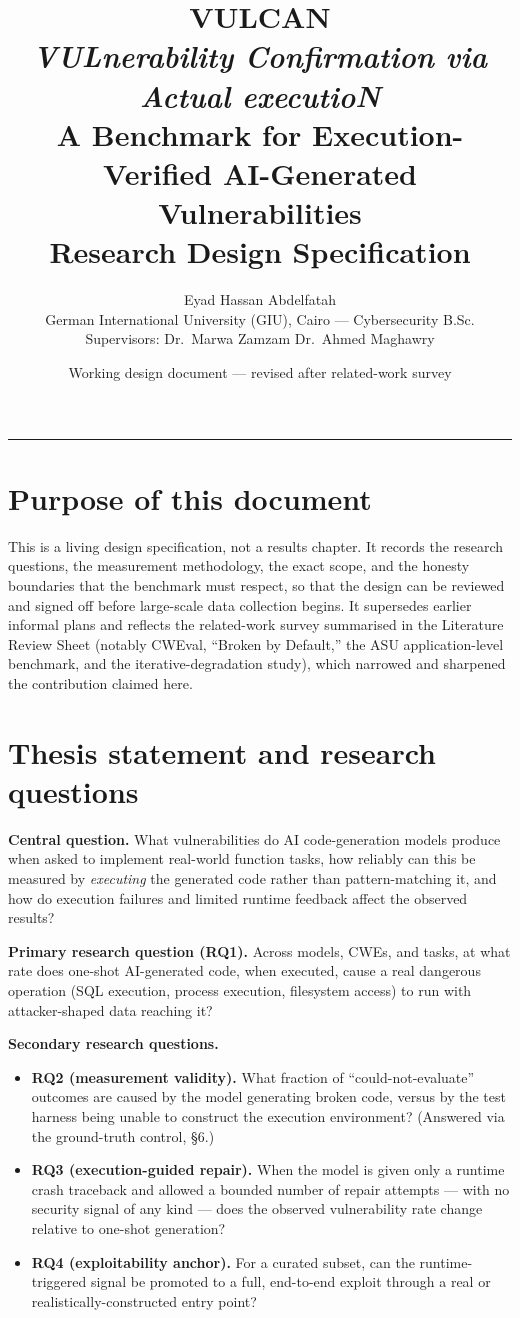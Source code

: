 \documentclass[11pt]{article}
\title{\vspace{-1.2cm}\textbf{\Huge VULCAN}\\[3pt]
\normalsize\textit{VULnerability Confirmation via Actual executioN}\\[8pt]
\large A Benchmark for Execution-Verified AI-Generated Vulnerabilities\\[3pt]
\normalsize Research Design Specification}
\author{Eyad Hassan Abdelfatah \\
\small German International University (GIU), Cairo --- Cybersecurity B.Sc. \\
\small Supervisors: Dr.\ Marwa Zamzam \textbar{} Dr.\ Ahmed Maghawry}
\date{\small Working design document --- revised after related-work survey}
\begin{document}
\maketitle
\vspace{-0.6cm}

\hrule
\vspace{8pt}

\section{Purpose of this document}

This is a living design specification, not a results chapter. It records
the research questions, the measurement methodology, the exact scope, and
the honesty boundaries that the benchmark must respect, so that the design
can be reviewed and signed off before large-scale data collection begins.
It supersedes earlier informal plans and reflects the related-work survey
summarised in the Literature Review Sheet (notably CWEval, ``Broken by
Default,'' the ASU application-level benchmark, and the iterative-degradation
study), which narrowed and sharpened the contribution claimed here.

\section{Thesis statement and research questions}

\textbf{Central question.} What vulnerabilities do AI code-generation models
produce when asked to implement real-world function tasks, how reliably can
this be measured by \emph{executing} the generated code rather than
pattern-matching it, and how do execution failures and limited runtime
feedback affect the observed results?

\textbf{Primary research question (RQ1).} Across models, CWEs, and tasks,
at what rate does one-shot AI-generated code, when executed, cause a real
dangerous operation (SQL execution, process execution, filesystem access)
to run with attacker-shaped data reaching it?

\textbf{Secondary research questions.}
\begin{itemize}[leftmargin=1.4em,itemsep=1pt,topsep=2pt]
  \item \textbf{RQ2 (measurement validity).} What fraction of
  ``could-not-evaluate'' outcomes are caused by the model generating
  broken code, versus by the test harness being unable to construct the
  execution environment? (Answered via the ground-truth control, \S6.)
  \item \textbf{RQ3 (execution-guided repair).} When the model is given
  only a runtime crash traceback and allowed a bounded number of repair
  attempts --- with no security signal of any kind --- does the observed
  vulnerability rate change relative to one-shot generation?
  \item \textbf{RQ4 (exploitability anchor).} For a curated subset, can the
  runtime-triggered signal be promoted to a full, end-to-end exploit through
  a real or realistically-constructed entry point?
\end{itemize}
\end{document}
